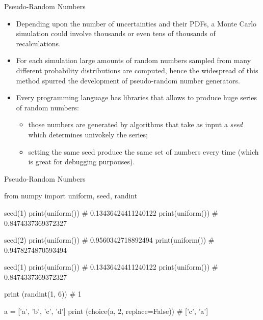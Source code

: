 \documentclass{beamer}
\begin{document}
\begin{frame}{Pseudo-Random Numbers}
    \begin{itemize}
    \item  Depending upon the number of uncertainties and their PDFs, a Monte Carlo simulation could involve thousands or even tens of thousands of recalculations.
    \item For each simulation large amounts of random numbers sampled from many different probability distributions are computed, hence the widespread of this method spurred the development of pseudo-random number generators. 
    \item Every programming language has libraries that allows to produce huge series of random numbers:
    \begin{itemize}
        \item those numbers are generated by algorithms that take as input a \emph{seed} which determines univokely the series; 
        \item setting the same seed produce the same set of numbers every time (which is great for debugging purpouses).
    \end{itemize}
    \end{itemize}
\end{frame}

\begin{frame}[fragile]{Pseudo-Random Numbers}  
\begin{ipython}
from numpy import uniform, seed, randint

seed(1)
print(uniform())       # 0.13436424411240122
print(uniform())       # 0.8474337369372327

seed(2)
print(uniform())       # 0.9560342718892494
print(uniform())       # 0.9478274870593494

seed(1)
print(uniform())       # 0.13436424411240122
print(uniform())       # 0.8474337369372327

print (randint(1, 6)) # 1

a = ['a', 'b', 'c', 'd']
print (choice(a, 2, replace=False))  # ['c', 'a']
\end{ipython}
\end{frame}
\end{document}
